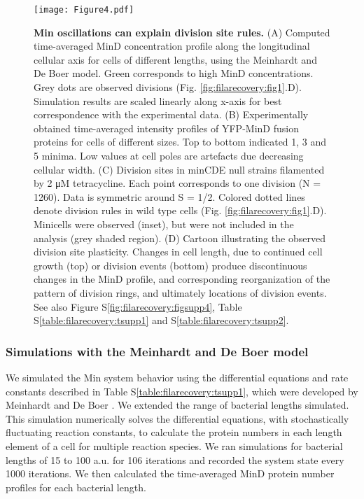 \begin{figure}
    \centering
    \texttt{[image: Figure4.pdf]}
    \caption{ 
        \textbf{Min oscillations can explain division site rules.}           
        (A) Computed time-averaged MinD concentration profile along the longitudinal cellular axis for cells of different lengths, using the Meinhardt and De Boer \cite{Meinhardt2001} model. Green corresponds to high MinD concentrations. Grey dots are observed divisions (Fig. \ref{fig:filarecovery:fig1}.D). Simulation results are scaled linearly along x-axis for best correspondence with the experimental data. (B) Experimentally obtained time-averaged intensity profiles of YFP-MinD fusion proteins for cells of different sizes. Top to bottom indicated 1, 3 and 5 minima. Low values at cell poles are artefacts due decreasing cellular width. (C) Division sites in minCDE null strains filamented by 2 μM tetracycline. Each point corresponds to one division (N = 1260). Data is symmetric around S = 1/2. Colored dotted lines denote division rules in wild type cells (Fig. \ref{fig:filarecovery:fig1}.D). Minicells were observed (inset), but were not included in the analysis (grey shaded region).  (D) Cartoon illustrating the observed division site plasticity. Changes in cell length, due to continued cell growth (top) or division events (bottom) produce discontinuous changes in the MinD profile, and corresponding reorganization of the pattern of division rings, and ultimately locations of division events. See also Figure S\ref{fig:filarecovery:figsupp4}, Table S\ref{table:filarecovery:tsupp1} and S\ref{table:filarecovery:tsupp2}.        
    }
    \label{fig:filarecovery:fig4}
\end{figure}

\subsubsection{Simulations with the Meinhardt and De Boer model}
We simulated the Min system behavior using the differential equations and rate constants described in Table S\ref{table:filarecovery:tsupp1}, which were developed by Meinhardt and De Boer \cite{Meinhardt2001}. We extended the range of bacterial lengths simulated. This simulation numerically solves the differential equations, with stochastically fluctuating reaction constants, to calculate the protein numbers in each length element of a cell for multiple reaction species. We ran simulations for bacterial lengths of 15 to 100 a.u. for 106 iterations and recorded the system state every 1000 iterations. We then calculated the time-averaged MinD protein number profiles for each bacterial length. 

